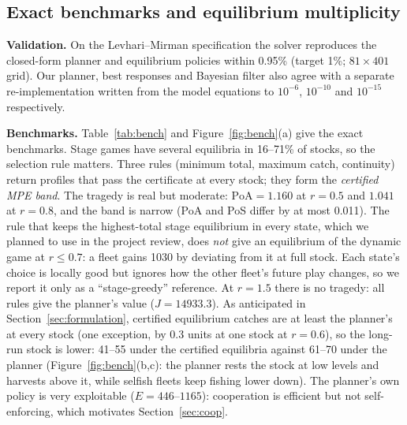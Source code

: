 \subsection{Exact benchmarks and equilibrium multiplicity}
\textbf{Validation.} On the Levhari--Mirman specification the solver reproduces the closed-form planner and equilibrium
policies within 0.95\% (target 1\%; $81\times401$ grid). Our planner, best responses and Bayesian filter also agree with
a separate re-implementation written from the model equations to $10^{-6}$, $10^{-10}$ and $10^{-15}$ respectively.

\textbf{Benchmarks.} Table~\ref{tab:bench} and Figure~\ref{fig:bench}(a) give the exact benchmarks. Stage games have
several equilibria in 16--71\% of stocks, so the selection rule matters. Three rules (minimum total, maximum catch,
continuity) return profiles that pass the certificate at every stock; they form the \emph{certified MPE band}. The tragedy
is real but moderate: $\mathrm{PoA}=1.160$ at $r=0.5$ and $1.041$ at $r=0.8$, and the band is narrow (PoA and PoS differ
by at most 0.011). The rule that keeps the highest-total stage equilibrium in every state, which we planned to use in the
project review, does \emph{not} give an equilibrium of the dynamic game at $r\le0.7$: a fleet gains 1030 by deviating from it
at full stock. Each state's choice is locally good but ignores how the other fleet's future play changes, so we
report it only as a ``stage-greedy'' reference. At $r=1.5$ there is no tragedy: all rules give the planner's value
($J=14933.3$). As anticipated in Section~\ref{sec:formulation}, certified equilibrium catches are at least the planner's
at every stock (one exception, by 0.3 units at one stock at $r=0.6$), so the long-run stock is lower: 41--55 under the
certified equilibria against 61--70 under the planner (Figure~\ref{fig:bench}(b,c): the planner rests the stock at low
levels and harvests above it, while selfish fleets keep fishing lower down). The planner's own policy is very exploitable ($E=446$--$1165$):
cooperation is efficient but not self-enforcing, which motivates Section~\ref{sec:coop}.

\begin{table}[h]
\centering
\caption{Exact benchmarks (known $r$). Band over the certified symmetric MPEs; PoA and PoS from Eq.~\eqref{eq:poa}.}
\label{tab:bench}
\small

\end{table}

